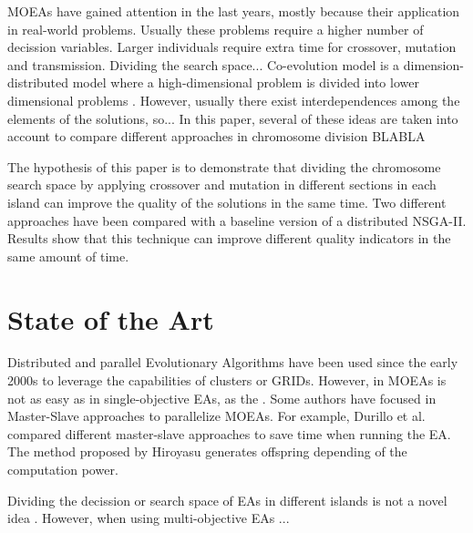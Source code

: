 \documentclass[runningheads,a4paper]{llncs}
\begin{document}
MOEAs have gained attention in the last years, mostly because their application in real-world problems. Usually these problems require a higher number of decission variables. Larger individuals require extra time for crossover, mutation and transmission. Dividing the search space...
Co-evolution model is a dimension-distributed model where a high-dimensional problem is divided into lower dimensional problems \cite{Gong15models}. However, usually there exist interdependences among the elements of the solutions, so... In this paper, several of these ideas are taken into account to compare different approaches in chromosome division BLABLA

The hypothesis of this paper is to demonstrate that dividing the chromosome search space by applying crossover and mutation in different sections in each island can improve the quality of the solutions in the same time. Two different approaches have been compared with a baseline version of a distributed NSGA-II. Results show that this technique can improve different quality indicators in the same amount of time.


%
\section{State of the Art}
\label{sec:SoA}

Distributed and parallel Evolutionary Algorithms have been used since the early 2000s \cite{ELQUESEA} to leverage the capabilities of clusters or GRIDs. However, in MOEAs is not as easy as in single-objective EAs, as the . Some authors have focused in Master-Slave approaches to parallelize MOEAs. For example, Durillo et al. \cite{Durillo08masterslave} compared different master-slave approaches to save time when running the EA. The method proposed by Hiroyasu \cite{Hiroyasu07discussion} generates offspring depending of the computation power. 

Dividing the decission or search space of EAs in different islands is not a novel idea \cite{ALGUNOANTIGUO}. However, when using multi-objective EAs ...
\end{document}
